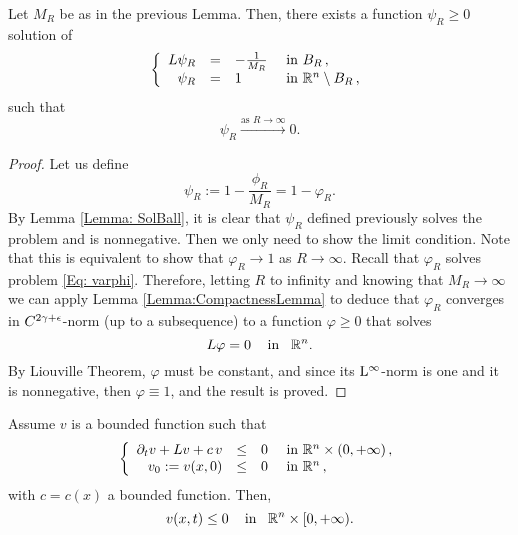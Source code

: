 \begin{lemma}
\label{Lemma: SolBallToZero}
Let $M_R$ be as in the previous Lemma. Then, there exists a function $\psi_R\geq 0$ solution of
\begin{equation*}
\left\{\begin{array}{rcll}
L \psi_R &=& -\frac{1}{M_R} & \textrm{ in } B_R\,,\\
\psi_R &=& 1 & \textrm{ in } \mathbb{R}^n\setminus B_R\,,
\end{array} \right.
\end{equation*}
such that
$$ \psi_R \xrightarrow{\text{as } R\to \infty}{} 0. $$
\end{lemma}

\begin{proof}
Let us define
$$ \psi_R := 1-\frac{\phi_R}{M_R} = 1-\varphi_R. $$
By Lemma \ref{Lemma: SolBall}, it is clear that $\psi_R$ defined previously solves the problem and is nonnegative. Then we only need to show the limit condition. Note that this is equivalent to show that $\varphi_R \to 1$ as $R\to\infty$. Recall that $\varphi_R$ solves problem \eqref{Eq: varphi}. Therefore, letting $R$ to infinity and knowing that $M_R\to \infty$ we can apply Lemma \ref{Lemma:CompactnessLemma} to deduce that $\varphi_R$ converges in  $C^{2\gamma+\epsilon}$-norm (up to a subsequence) to a function $\varphi\geq 0$ that solves
$$ L\varphi = 0 \,\,\,\,\, \text{ in } \,\,\, \mathbb{R}^n. $$
By Liouville Theorem, $\varphi$ must be constant, and since its $\mathrm{L}^{\infty}$-norm is one and it is nonnegative, then $\varphi\equiv 1$, and the result is proved.
\end{proof}

\begin{theorem}
\label{Thm: ParaMaxPrp}
Assume $v$ is a bounded function such that
\begin{equation*}
\left\{\begin{array}{rcll}
\partial_t v + L v + c\,v &\leq& 0 & \textrm{ in }\mathbb{R}^n\times(0,+\infty)\,,\\
v_0:=v(x,0) &\leq& 0 & \textrm{ in } \mathbb{R}^n\,,
\end{array} \right.
\end{equation*}
with $c=c(x)$ a bounded function. Then,
$$ v(x,t) \leq 0 \,\,\,\,\,\text{ in } \,\,\, \mathbb{R}^n\times[0,+\infty). $$
\end{theorem}


